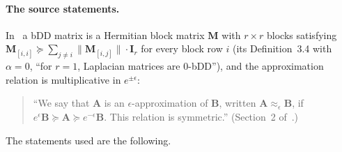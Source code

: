 \documentclass[11pt]{article}
\theoremstyle{remark}
\renewcommand{\AA}{\mathbf A}
\newcommand{\BB}{\mathbf B}
\newcommand{\II}{\mathbf I}
\newcommand{\MM}{\mathbf M}
\begin{document}
\paragraph{The source statements.}
In~\cite{KLPSS16:conf} a bDD matrix is a Hermitian block matrix
$\MM$ with $r\times r$ blocks satisfying
$\MM_{[i,i]}\succeq\sum_{j\ne i}\lVert\MM_{[i,j]}\rVert\cdot\II_r$ for every
block row $i$ (its Definition~3.4 with $\alpha=0$, ``for $r=1$, Laplacian
matrices are $0$-bDD''), and the approximation relation is multiplicative
in $e^{\pm\epsilon}$:
\begin{quote}
``We say that $\AA$ is an $\epsilon$-approximation of $\BB$, written
$\AA\approx_{\epsilon}\BB$, if
$e^{\epsilon}\BB\succeq\AA\succeq e^{-\epsilon}\BB$.
This relation is symmetric.''
(Section~2 of~\cite{KLPSS16:conf}.)
\end{quote}
The statements used are the following.
\end{document}

